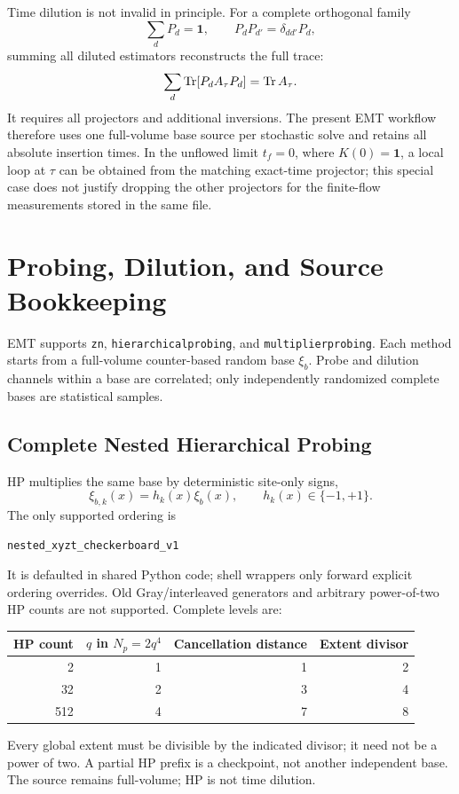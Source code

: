 \documentclass[11pt,a4paper]{article}
\newcommand{\code}[1]{\texttt{\begingroup\def\_{\textunderscore\allowbreak}#1\endgroup}}
\newcommand{\Tf}{t_f}
\begin{document}
Time dilution is not invalid in principle.  For a complete orthogonal family
\begin{equation}
  \sum_d P_d = \mathbf{1},
  \qquad
  P_dP_{d'}=\delta_{dd'}P_d,
\end{equation}
summing all diluted estimators reconstructs the full trace:
\begin{equation}
  \sum_d
  \Tr\!\left[P_dA_\tau P_d\right]
  =
  \Tr A_\tau.
  \label{eq:complete_time_dilution}
\end{equation}
It requires all projectors and additional inversions.  The present EMT workflow
therefore uses one full-volume base source per stochastic solve and retains all
absolute insertion times.  In the unflowed limit \(\Tf=0\), where
\(K(0)=\mathbf{1}\), a local loop at \(\tau\) can be obtained from the matching
exact-time projector; this special case does not justify dropping the other
projectors for the finite-flow measurements stored in the same file.

\section{Probing, Dilution, and Source Bookkeeping}

EMT supports \code{zn}, \code{hierarchical\_probing}, and
\code{multiplier\_probing}. Each method starts from a full-volume counter-based
random base \(\xi_b\). Probe and dilution channels within a base are correlated;
only independently randomized complete bases are statistical samples.

\subsection{Complete Nested Hierarchical Probing}

HP multiplies the same base by deterministic site-only signs,
\begin{equation}
  \xi_{b,k}(x)=h_k(x)\xi_b(x),\qquad h_k(x)\in\{-1,+1\}.
  \label{eq:hp_source}
\end{equation}
The only supported ordering is
\begin{verbatim}
nested_xyzt_checkerboard_v1
\end{verbatim}
It is defaulted in shared Python code; shell wrappers only forward explicit
ordering overrides. Old Gray/interleaved generators and arbitrary power-of-two
HP counts are not supported. Complete levels are:
\begin{center}
\begin{tabular}{rrrr}
\toprule
HP count & \(q\) in \(N_p=2q^4\) & Cancellation distance & Extent divisor \\
\midrule
2 & 1 & 1 & 2 \\
32 & 2 & 3 & 4 \\
512 & 4 & 7 & 8 \\
\bottomrule
\end{tabular}
\end{center}
Every global extent must be divisible by the indicated divisor; it need not
be a power of two. A partial HP prefix is a checkpoint, not another independent
base. The source remains full-volume; HP is not time dilution.
\end{document}
